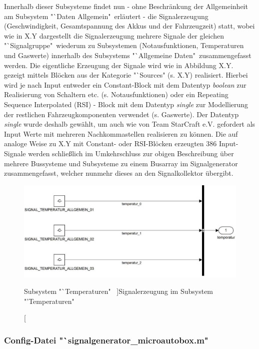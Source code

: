 \documentclass[fontsize = 12pt, paper = a4]{scrreprt}
\begin{document}
Innerhalb dieser Subsysteme findet nun - ohne Beschränkung der Allgemeinheit am Subsystem "`Daten Allgemein"\ erläutert - die Signalerzeugung (Geschwindigkeit, Gesamtspannung des Akkus und der Fahrzeugzeit) statt, wobei wie in X.Y dargestellt die Signalerzeugung mehrere Signale der gleichen "`Signalgruppe"\ wiederum zu Subsystemen (Notausfunktionen, Temperaturen und Gaswerte)  innerhalb des Subsystems "`Allgemeine Daten"\ zusammengefasst werden. Die eigentliche Erzeugung der Signale wird wie in Abbildung X.Y. gezeigt mittels Blöcken aus der Kategorie "`Sources" (s. X.Y) realisiert. Hierbei wird je nach Input entweder ein Constant-Block mit dem Datentyp \textit{boolean} zur Realisierung von Schaltern etc. (s. Notausfunktionen) oder ein Repeating Sequence Interpolated (RSI) - Block mit dem Datentyp \textit{single} zur Modellierung der restlichen Fahrzeugkomponenten verwendet (s. Gaswerte). Der Datentyp \textit{single} wurde deshalb gewählt, um auch wie von Team StarCraft e.V. gefordert als Input Werte mit mehreren Nachkommastellen realisieren zu können. Die auf analoge Weise zu X.Y mit Constant- oder RSI-Blöcken erzeugten 386 Input-Signale werden schließlich im Umkehrschluss zur obigen Beschreibung über mehrere Bussysteme und Subsysteme zu einem Busarray im Signalgenerator zusammengefasst, welcher nunmehr dieses an den Signalkollektor übergibt.   

\newpage

  
\begin{figure}[h]
\centering
\includegraphics[scale = 0.65]{subsubtemp}
\caption[Subsystem "`Temperaturen" \ ]{Signalerzeugung im Subsystem "'Temperaturen" \ }
\end{figure}

\subsubsection{Config-Datei "`signalgenerator\_microautobox.m" }
\end{document}
